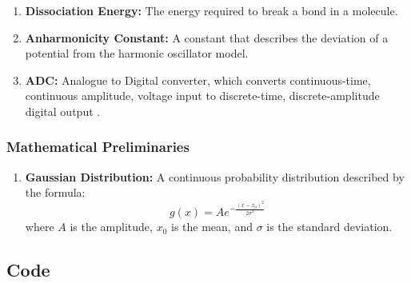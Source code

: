 \documentclass{article}
\begin{document}
\begin{enumerate}
    \item \textbf{Dissociation Energy:} The energy required to break a bond in a molecule.
    
    \item \textbf{Anharmonicity Constant:} A constant that describes the deviation of a potential from the harmonic oscillator model.
    
    \item \textbf{ADC:} Analogue to Digital converter, which converts continuous-time, continuous amplitude, voltage input to discrete-time, discrete-amplitude digital output \cite{enwiki:1248045950}.
    
\end{enumerate}
\subsubsection{Mathematical Preliminaries}
\begin{enumerate}
    \item \textbf{Gaussian Distribution:} A continuous probability distribution described by the formula:
    \begin{equation}
        g(x) = Ae^{-\frac{(x-x_0)^2}{2\sigma^2}}
    \end{equation}
    where $A$ is the amplitude, $x_0$ is the mean, and $\sigma$ is the standard deviation.
\end{enumerate}
\subsection{Code}






\end{document}
